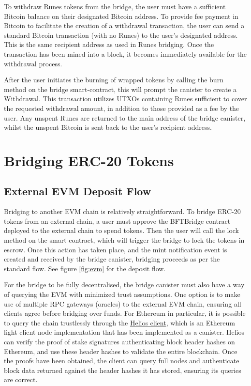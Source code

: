 \documentclass{article}
\begin{document}
To withdraw Runes tokens from the bridge, the user must have a sufficient Bitcoin balance on their designated Bitcoin address. To provide fee payment in Bitcoin to facilitate the creation of a withdrawal transaction, the user can send a standard Bitcoin transaction (with no Runes) to the user's designated address. This is the same recipient address as used in Runes bridging. Once the transaction has been mined into a block, it becomes immediately available for the withdrawal process.

After the user initiates the burning of wrapped tokens by calling the burn method on the bridge smart-contract, this will prompt the canister to create a Withdrawal. This transaction utilizes UTXOs containing Runes sufficient to cover the requested withdrawal amount, in addition to those provided as a fee by the user. Any unspent Runes are returned to the main address of the bridge canister, whilst the unspent Bitcoin is sent back to the user's recipient address. 

\section{Bridging ERC-20 Tokens}
\subsection{External EVM Deposit Flow}
Bridging to another EVM chain is relatively straightforward.  To bridge ERC-20 tokens from an external chain, a user must approve the BFTBridge contract deployed to the external chain to spend tokens. Then the user will call the lock method on the smart contract, which will trigger the bridge to lock the tokens in escrow. Once this action has taken place, and the mint notification event is created and received by the bridge canister, bridging proceeds as per the standard flow. See figure \ref{fig:evm} for the deposit flow. 

For the bridge to be fully decentralised, the bridge canister must also have a way of querying the EVM with minimized trust assumptions. One option is to make use of multiple RPC gateways (oracles) to the external EVM chain, ensuring all clients agree before bridging over funds.  For Ethereum in particular, it is possible to query the chain trustlessly through the \href{https://github.com/eigerco/ethereum-canister}{Helios client}, which is an Ethereum light client node implementation that has been implemented as a canister. Helios can verify the proof of stake signatures authenticating block header hashes on Ethereum, and use these header hashes to validate  the entire blockchain. Once the proofs have been obtained, the client can query full nodes and authenticate block data returned against the header hashes it has stored, ensuring its queries are correct. 
\end{document}
